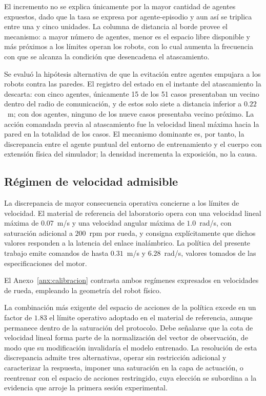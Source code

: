El incremento no se explica únicamente por la mayor cantidad de agentes
expuestos, dado que la tasa se expresa por agente-episodio y aun así se
triplica entre una y cinco unidades. La columna de distancia al borde provee
el mecanismo: a mayor número de agentes, menor es el espacio libre disponible
y más próximos a los límites operan los robots, con lo cual aumenta la
frecuencia con que se alcanza la condición que desencadena el atascamiento.

Se evaluó la hipótesis alternativa de que la evitación entre agentes
empujara a los robots contra las paredes. El registro del estado en el
instante del atascamiento la descarta: con cinco agentes, únicamente 15 de los
51 casos presentaban un vecino dentro del radio de comunicación, y de estos
solo siete a distancia inferior a $0{.}22$~m; con dos agentes, ninguno de los
nueve casos presentaba vecino próximo. La acción comandada previa al
atascamiento fue la velocidad lineal máxima hacia la pared en la totalidad de
los casos. El mecanismo dominante es, por tanto, la discrepancia entre el
agente puntual del entorno de entrenamiento y el cuerpo con extensión física
del simulador; la densidad incrementa la exposición, no la causa.

\subsection*{Régimen de velocidad admisible}

La discrepancia de mayor consecuencia operativa concierne a los límites de
velocidad. El material de referencia del laboratorio opera con una velocidad
lineal máxima de $0{.}07$~m/s y una velocidad angular máxima de $1{.}0$~rad/s,
con saturación adicional a $200$~rpm por rueda, y consigna explícitamente
que dichos valores responden a la latencia del enlace inalámbrico. La política
del presente trabajo emite comandos de hasta $0{.}31$~m/s y $6{.}28$~rad/s,
valores tomados de las especificaciones del motor.

El Anexo~\ref{anx:calibracion} contrasta ambos regímenes expresados en
velocidades de rueda, empleando la geometría del robot físico.

La combinación más exigente del espacio de acciones de la política excede en
un factor de $1{.}83$ el límite operativo adoptado en el material de
referencia, aunque permanece dentro de la saturación del protocolo. Debe
señalarse que la cota de velocidad lineal forma parte de la normalización del
vector de observación, de modo que su modificación invalidaría el modelo
entrenado. La resolución de esta discrepancia admite tres alternativas, operar sin restricción adicional y caracterizar la respuesta, imponer una
saturación en la capa de actuación, o reentrenar con el espacio de acciones
restringido,  cuya elección se subordina a la evidencia que arroje la primera
sesión experimental.

